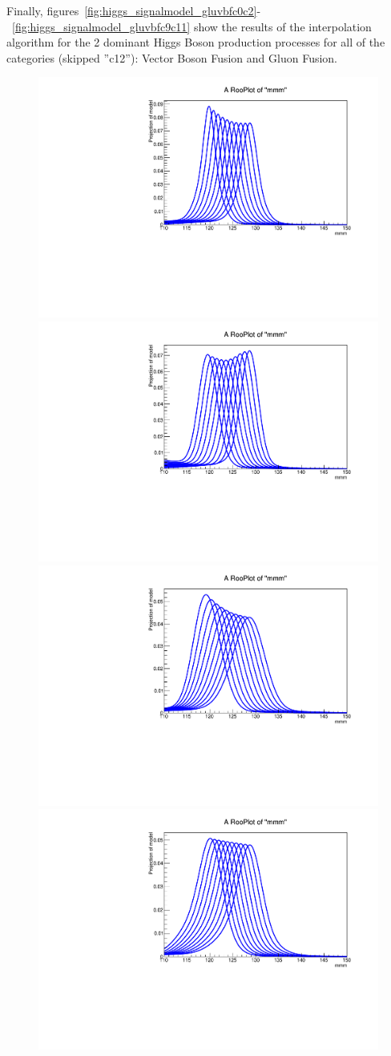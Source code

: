 Finally, figures~\ref{fig:higgs_signalmodel_gluvbfc0c2}-~\ref{fig:higgs_signalmodel_gluvbfc9c11} show the results of the interpolation algorithm for the 2 dominant Higgs Boson production processes for all of the categories (skipped ''c12''): Vector Boson Fusion and Gluon Fusion.
\begin{figure}[hbp]
  \centering
  \includegraphics[width=0.49\linewidth]{figures/signal_model/AppendixBdt/interpolation_GluGlu_cat0.pdf}
  \includegraphics[width=0.49\linewidth]{figures/signal_model/AppendixBdt/interpolation_VBF_cat0.pdf}\\
  \includegraphics[width=0.49\linewidth]{figures/signal_model/AppendixBdt/interpolation_GluGlu_cat1.pdf}
  \includegraphics[width=0.49\linewidth]{figures/signal_model/AppendixBdt/interpolation_VBF_cat1.pdf}\\

\end{figure}
